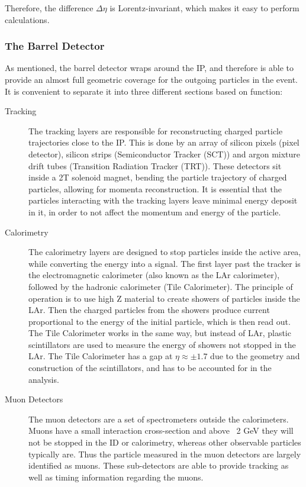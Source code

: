 Therefore, the difference $\Delta \eta$ is Lorentz-invariant, which makes it easy to perform calculations.

\subsubsection{The Barrel Detector}
As mentioned, the barrel detector wraps around the IP, and therefore is able to provide an almost full geometric coverage for the outgoing particles in the event. It is convenient to separate it into three different sections based on function:

\begin{description}
	\item [Tracking] The tracking layers are responsible for reconstructing charged particle trajectories close to the IP. This is done by an array of silicon pixels (pixel detector), silicon strips (Semiconductor Tracker (SCT)) and  argon mixture drift tubes (Transition Radiation Tracker (TRT)). These detectors sit inside a 2T solenoid magnet, bending the particle trajectory of charged particles, allowing for momenta reconstruction. It is essential that the particles interacting with the tracking layers leave minimal energy deposit in it, in order to not affect the momentum and energy of the particle.
	
	\item [Calorimetry] The calorimetry layers are designed to stop particles inside the active area, while converting the energy into a signal. The first layer past the tracker is the electromagnetic calorimeter (also known as the LAr calorimeter), followed by the hadronic calorimeter (Tile Calorimeter). The principle of operation is to use high Z material to create showers of particles inside the LAr. Then the charged particles from the showers produce current proportional to the energy of the initial particle, which is then read out. The Tile Calorimeter works in the same way, but instead of LAr, plastic scintillators are used to measure the energy of showers not stopped in the LAr. The Tile Calorimeter has a gap at $\eta \approx \pm 1.7$ due to the geometry and construction of the scintillators, and has to be accounted for in the analysis.
	
	\item [Muon Detectors] The muon detectors are a set of spectrometers outside the calorimeters.  Muons have a small interaction cross-section and above ~2 GeV they will not be stopped in the ID or calorimetry, whereas other observable particles typically are.  Thus the particle measured in the muon detectors are largely identified as muons.
	These sub-detectors are able to provide tracking as well as timing information regarding the muons. 
\end{description}
  

